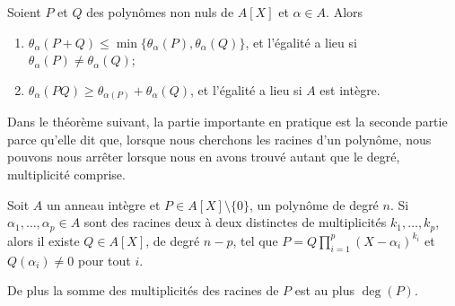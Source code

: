 \begin{lemma}       \label{LemIeLhpc}
    Soient \( P\) et \( Q\) des polynômes non nuls de \( A[X]\) et \( \alpha\in A\). Alors
    \begin{enumerate}
        \item
            \( \theta_{\alpha}(P+Q)\leq\min\{
            \theta_{\alpha}(P),\theta_{\alpha}(Q) \}\), et l'égalité a
            lieu si \( \theta_{\alpha}(P)\neq \theta_{\alpha}(Q)\);
        \item     \label{ItemIeLhpciv}
            \( \theta_{\alpha}(PQ)\geq
            \theta_{\alpha(P)}+\theta_{\alpha}(Q)\), et l'égalité a
            lieu si \( A \) est intègre.
    \end{enumerate}
\end{lemma}

Dans le théorème suivant, la partie importante en pratique est la seconde partie parce qu'elle dit que, lorsque nous cherchons les racines d'un polynôme, nous pouvons nous arrêter lorsque nous en avons trouvé autant que le degré, multiplicité comprise.
\begin{theorem} \label{ThoSVZooMpNANi}
    Soit \( A\) un anneau intègre
  et \( P\in A[X]\setminus\{ 0 \}\), un polynôme de degré \( n\). Si
  \( \alpha_1,\ldots, \alpha_p\in A\) sont des racines deux à deux
  distinctes de multiplicités \( k_1,\ldots, k_p\), alors il existe \(
  Q\in A[X]\), de degré \( n-p\), tel que \(
  P=Q\prod_{i=1}^p(X-\alpha_i)^{k_i}\) et \( Q(\alpha_i)\neq 0\) pour
  tout $i$.

    De plus la somme des multiplicités des racines de \( P\) est au plus \( \deg(P)\).
\end{theorem}

